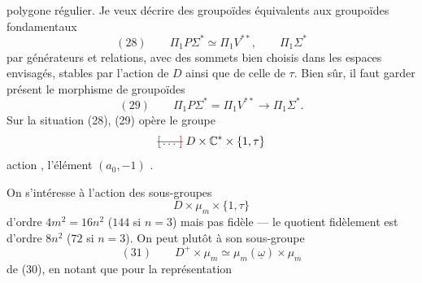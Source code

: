\documentclass[11pt,a4paper]{article}
\begin{document}
polygone régulier. Je veux décrire des groupoïdes équivalents aux
groupoïdes fondamentaux
\[
  (28)\qquad \Pi_1 P\Sigma^{*} \simeq \Pi_1 V^{**} , \qquad \Pi_1 \Sigma^{*}
\]
par générateurs et relations, avec des sommets bien choisis dans les
espaces envisagés, stables par l'action de $D$ ainsi que de celle de
$\tau$. Bien sûr, il faut garder présent le morphisme de groupoïdes
\[
  (29)\qquad \Pi_1 P\Sigma^{*} = \Pi_1 V^{**} \longrightarrow \Pi_1 \Sigma^{*} .
\]
Sur la situation (28), (29) opère le groupe
\[
  \text{\struck{\ill{}}}\; D \times \mathbb{C}^{*} \times \{1, \tau\}
\]
 action , l'élément $(a_0, -1)$
.

On s'intéresse  à l'action des sous-groupes
\[
  D \times \mu_m \times \{1, \tau\}
\]
d'ordre \struck{\ill{}} $4m^{2} = 16n^{2}$ ($144$ si $n = 3$) mais
 pas fidèle --- le quotient 
fidèlement est d'ordre $8n^{2}$ ($72$ si $n = 3$).
On peut  plutôt à son sous-groupe
\[
  (31)\qquad D^{+} \times \mu_m \simeq \mu_m(\underline{\omega}) \times \mu_m
\]
de (30), en notant que pour la représentation
\end{document}
